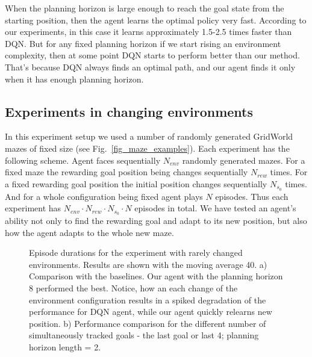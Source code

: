 \documentclass[a4paper,twoside]{article}
\begin{document}
When the planning horizon is large enough to reach the goal state from the starting position, then the agent learns the optimal policy very fast. According to our experiments, in this case it learns approximately 1.5-2.5 times faster than DQN. But for any fixed planning horizon if we start rising an environment complexity, then at some point DQN starts to perform better than our method. That's because DQN always finds an optimal path, and our agent finds it only when it has enough planning horizon.

\subsection{Experiments in changing environments}

In this experiment setup we used a number of randomly generated GridWorld mazes of fixed size (see Fig.~\ref{fig_maze_examples}). Each experiment has the following scheme. Agent faces sequentially $N_{env}$ randomly generated mazes. For a fixed maze the rewarding goal position being changes sequentially $N_{rew}$ times. For a fixed rewarding goal position the initial position changes sequentially $N_{s_0}$ times. And for a whole configuration being fixed agent plays $N$ episodes. Thus each experiment has $N_{env} \cdot N_{rew} \cdot N_{s_0} \cdot N$ episodes in total. We have tested an agent's ability not only to find the rewarding goal and adapt to its new position, but also how the agent adapts to the whole new maze.

\begin{figure}
  \centering
  \begin{minipage}{\linewidth}
    
    \subcaption{}
    \vspace*{10pt}

    
    \subcaption{}
    \vspace*{4pt}
  \end{minipage}
  \caption{Episode durations for the experiment with rarely changed environments. Results are shown with the moving average 40. a) Comparison with the baselines. Our agent with the planning horizon 8 performed the best. Notice, how an each change of the environment configuration results in a spiked degradation of the performance for DQN agent, while our agent quickly relearns new position. b) Performance comparison for the different number of simultaneously tracked goals - the last goal or last 4; planning horizon length = 2. } \label{fig_rare_changes}
\end{figure}
\end{document}
